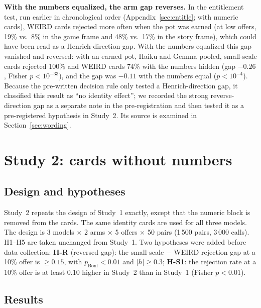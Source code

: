 \documentclass[11pt]{article}
\begin{document}
\textbf{With the numbers equalized, the arm gap reverses.} In the entitlement test, run earlier in chronological order (Appendix~\ref{sec:entitle}; with numeric cards), WEIRD cards rejected more often when the pot was earned (at low offers, 19\% vs.\ 8\% in the game frame and 48\% vs.\ 17\% in the story frame), which could have been read as a Henrich-direction gap. With the numbers equalized this gap vanished and reversed: with an earned pot, Haiku and Gemma pooled, small-scale cards rejected 100\% and WEIRD cards 74\% with the numbers hidden (gap $-0.26$, Fisher $p < 10^{-33}$), and the gap was $-0.11$ with the numbers equal ($p < 10^{-4}$). Because the pre-written decision rule only tested a Henrich-direction gap, it classified this result as ``no identity effect''; we recorded the strong reverse-direction gap as a separate note in the pre-registration and then tested it as a pre-registered hypothesis in Study~2. Its source is examined in Section~\ref{sec:wording}.


\section{Study 2: cards without numbers}\label{sec:study2}

\subsection{Design and hypotheses}

Study~2 repeats the design of Study~1 exactly, except that the numeric block is removed from the cards. The same identity cards are used for all three models. The design is 3 models $\times$ 2 arms $\times$ 5 offers $\times$ 50 pairs (1\,500 pairs, 3\,000 calls). H1--H5 are taken unchanged from Study~1. Two hypotheses were added before data collection: \textbf{H-R} (reversed gap): the small-scale $-$ WEIRD rejection gap at a 10\% offer is $\geq 0.15$, with $p_{\text{Bonf}} < 0.01$ and $|h| \geq 0.3$; \textbf{H-S1}: the rejection rate at a 10\% offer is at least 0.10 higher in Study~2 than in Study~1 (Fisher $p < 0.01$).

\subsection{Results}
\end{document}
